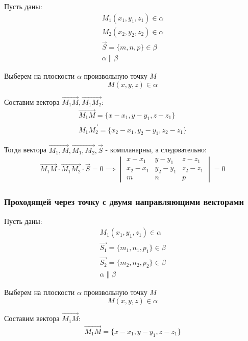 Пусть даны:
\begin{gather*}
  M_1(x_1, y_1, z_1) \in \alpha \\
  M_2(x_2, y_2, z_2) \in \alpha \\
  \vec{S} = \{m, n, p\} \in \beta \\
  \alpha \parallel \beta
\end{gather*}

Выберем на плоскости $\alpha$ произвольную точку $M$  \[
M(x, y, z) \in \alpha
\] 

Составим вектора $\overrightarrow{M_1 M}, \overrightarrow{M_1 M_2}$:
\begin{gather*}
  \overrightarrow{M_1 M} = \{x - x_1, y - y_1, z - z_1\} \\
  \overrightarrow{M_1 M_2} = \{x_2 - x_1, y_2 - y_1, z_2 - z_1\} 
\end{gather*}

Тогда вектора $\overrightarrow{M_1, M}, \overrightarrow{M_1, M_2}, \vec{S}$ - компланарны, а следовательно:
\begin{gather*}
  \overrightarrow{M_1 M} \cdot \overrightarrow{M_1 M_2} \cdot \vec{S} = 0
  \implies \boxed{
  \begin{vmatrix}
    x - x_1 & y - y_1 & z - z_1 \\
    x_2 - x_1 & y_2 - y_1 & z_2 - z_1 \\
       m    &     n    &    p
   \end{vmatrix} = 0}
\end{gather*}

\subsubsection{Проходящей через точку с двумя направляющими векторами}

Пусть даны:
\begin{gather*}
  M_1(x_1, y_1, z_1) \in \alpha \\
  \vec{S_1} = \{m_1, n_1, p_1\} \in \beta \\
  \vec{S_2} = \{m_2, n_2, p_2\} \in \beta \\
  \alpha \parallel \beta
\end{gather*}

Выберем на плоскости $\alpha$ произвольную точку $M$  \[
M(x, y, z) \in \alpha
\] 

Составим вектора $\overrightarrow{M_1 M}$:
\begin{gather*}
  \overrightarrow{M_1 M} = \{x - x_1, y - y_1, z - z_1\} 
\end{gather*}

